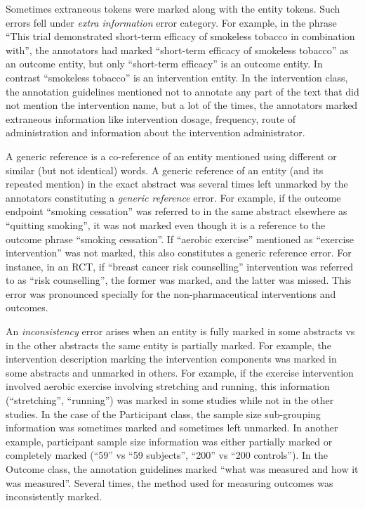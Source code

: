 \documentclass[10.7pt,]{article}
\begin{document}
Sometimes extraneous tokens were marked along with the entity tokens. 
Such errors fell under \textit{extra information} error category.
For example, in the phrase ``This trial demonstrated short-term efficacy of smokeless tobacco in combination with'', the annotators had marked ``short-term efficacy of smokeless tobacco'' as an outcome entity, but only ``short-term efficacy'' is an outcome entity. In contrast ``smokeless tobacco'' is an intervention entity. 
In the intervention class, the annotation guidelines mentioned not to annotate any part of the text that did not mention the intervention name, but a lot of the times, the annotators marked extraneous information like intervention dosage, frequency, route of administration and information about the intervention administrator.


A generic reference is a co-reference of an entity mentioned using different or similar (but not identical) words. 
A generic reference of an entity (and its repeated mention) in the exact abstract was several times left unmarked by the annotators constituting a \textit{generic reference} error.
For example, if the outcome endpoint ``smoking cessation'' was referred to in the same abstract elsewhere as ``quitting smoking'', it was not marked even though it is a reference to the outcome phrase ``smoking cessation''.
If ``aerobic exercise'' mentioned as ``exercise intervention'' was not marked, this also constitutes a generic reference error.
For instance, in an RCT, if ``breast cancer risk counselling'' intervention was referred to as ``risk counselling'', the former was marked, and the latter was missed.
This error was pronounced specially for the non-pharmaceutical interventions and outcomes.

An \textit{inconsistency} error arises when an entity is fully marked in some abstracts vs in the other abstracts the same entity is partially marked. 
For example, the intervention description marking the intervention components was marked in some abstracts and unmarked in others.
For example, if the exercise intervention involved aerobic exercise involving stretching and running, this information (``stretching'', ``running'') was marked in some studies while not in the other studies.
In the case of the Participant class, the sample size sub-grouping information was sometimes marked and sometimes left unmarked.
In another example, participant sample size information was either partially marked or completely marked (``59'' vs ``59 subjects'', ``200'' vs ``200 controls'').
In the Outcome class, the annotation guidelines marked ``what was measured and how it was measured''. 
Several times, the method used for measuring outcomes was inconsistently marked.
\end{document}
